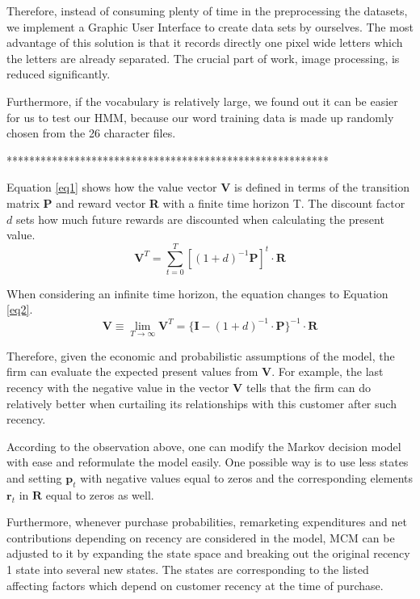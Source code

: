 \documentclass[11pt]{article}
\begin{document}
Therefore, instead of consuming plenty of time in the preprocessing the datasets, we implement a Graphic User Interface to create data sets by ourselves. The most advantage of this solution is that it records directly one pixel wide letters which the letters are already separated. The crucial part of work, image processing, is reduced significantly.

Furthermore, if the vocabulary is relatively large, we found out it can be easier for us to test our HMM, because our word training data is made up randomly chosen from the 26 character files.


*********************************************************






Equation \ref{eq1} shows how the value vector \textbf{V} is defined in terms of the transition matrix  \textbf{P} and reward vector  \textbf{R} with a finite time horizon T.
The discount factor $d$ sets how much future rewards are discounted when calculating the present value.
\begin{equation}\label{eq1}
\textbf{V}^T = \sum_{t=0}^T  [(1 + d)^{-1} \textbf{P}]^t \cdot \textbf{R}
\end{equation}

When considering an infinite time horizon, the equation changes to Equation \ref{eq2}.
\begin{equation}\label{eq2}
\textbf{V} \equiv \lim_{T \rightarrow \infty} \textbf{V}^T = \{\textbf{I} - (1 + d)^{-1} \cdot \textbf{P} \}^{-1} \cdot \textbf{R}
\end{equation}


Therefore, given the economic and probabilistic assumptions of the model, the firm can evaluate the expected present values from $\textbf{V}$. For example, the last recency with the negative value in the vector $\textbf{V}$ tells that the firm can do relatively better when curtailing its relationships with this customer after such recency.

According to the observation above, one can modify the Markov decision model with ease and reformulate the model easily. One possible way is to use less states and setting $\textbf{p}_t$ with negative values equal to zeros and the corresponding elements $\textbf{r}_t$ in $\textbf{R}$ equal to zeros as well.

Furthermore, whenever purchase probabilities, remarketing expenditures and net contributions depending on recency are considered in the model, MCM can be adjusted to it by expanding the state space and breaking out the original recency 1 state into several new states. The states are  corresponding to the listed affecting factors which depend on customer recency at the time of purchase. 
\end{document}
